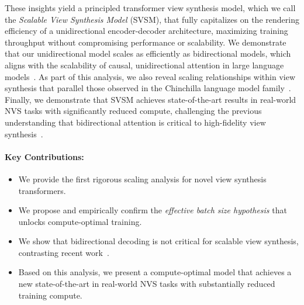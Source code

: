 These insights yield a principled transformer view synthesis model, which we call the \textit{Scalable View Synthesis Model} (SVSM), that fully capitalizes on the rendering efficiency of a unidirectional encoder-decoder architecture, maximizing training throughput without compromising performance or scalability.
We demonstrate that our unidirectional model scales as efficiently as bidirectional models, which aligns with the scalability of causal, unidirectional attention in large language models~\citep{kaplan2020scaling}. 
As part of this analysis, we also reveal scaling relationships within view synthesis that parallel those observed in the Chinchilla language model family~\citep{hoffmann2022training}.
Finally, we demonstrate that SVSM achieves state-of-the-art results in real-world NVS tasks with significantly reduced compute, challenging the previous understanding that bidirectional attention is critical to high-fidelity view synthesis~\citep{jin2024lvsm}.

\vspace{-0.5\baselineskip}
\paragraph{Key Contributions:}
\begin{itemize}
    \item We provide the first rigorous scaling analysis for novel view synthesis transformers.
    \item We propose and empirically confirm the \textit{effective batch size hypothesis} that unlocks compute-optimal training.
    \item We show that bidirectional decoding is not critical for scalable view synthesis, contrasting recent work~\cite{jin2024lvsm}.
    \item Based on this analysis, we present a compute-optimal model that achieves a new state-of-the-art in real-world NVS tasks with substantially reduced training compute. 
\end{itemize}











